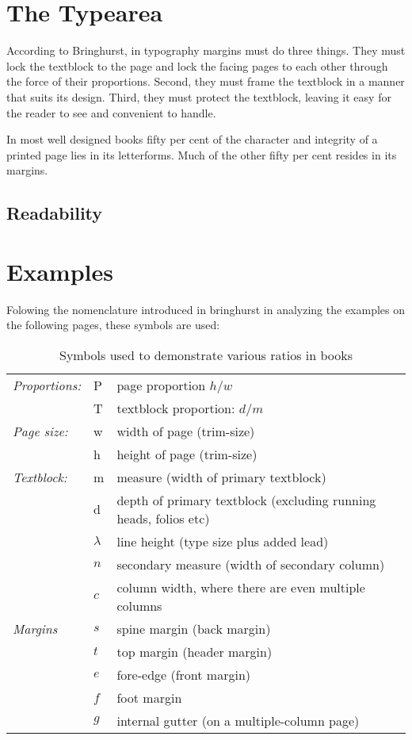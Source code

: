 \section{The Typearea}

According to Bringhurst\cite{bringhurst2005}, in typography margins must do three things. They must lock the
textblock to the page and lock the facing pages to each other through the force of their proportions. Second, they must frame the textblock
in a manner that suits its design. Third, they must protect the textblock, leaving it easy for the reader to see and convenient to handle. 

In most well designed books fifty per cent of the character and integrity of a printed page lies in its letterforms. Much of the other fifty per cent resides in its margins.

\subsection{Readability}

\section{Examples}
Folowing the nomenclature introduced in bringhurst in analyzing the examples on the following pages, 
these symbols are used:

\begin{table}[htbp]
\begin{tabular}{l l @{ = } p{6cm}}
\textit{Proportions:}      &P  &  page proportion $h/w$\\
~                      &T &  textblock proportion: $d/m$\\
\textit{Page size:}         &w &  width of page (trim-size)\\
~                      &h  & height of page (trim-size)\\
\textit{Textblock:}           &m & measure (width of primary textblock)\\
~                      &d  & depth of primary textblock (excluding running heads, folios etc)\\                      
~                      &$\lambda$ & line height (type size plus added lead)\\
~                      &$n$ & secondary measure (width of secondary column)\\
~                      &$c$  & column width, where there are even multiple columns\\
\textit{Margins}  &$s$  & spine margin (back margin)\\
~                      &$t$   & top margin (header margin)\\
                        &$e$  & fore-edge (front margin)\\
                        &$f$   & foot margin\\
                        &$g$  & internal gutter (on a multiple-column page)\\
\end{tabular}
\caption{Symbols used to demonstrate various ratios in books}
\end{table}
\medskip


